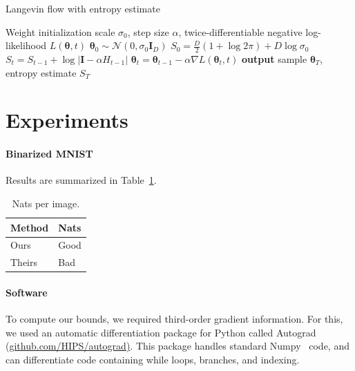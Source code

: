 \documentclass{article}
\newcommand{\vg}{\mathbf{g}}
\newcommand{\vr}{\mathbf{r}}
\newcommand{\vI}{\mathbf{I}}
\newcommand{\tra}{^{\mathsf{T}}}
\newcommand{\N}[2]{\mathcal{N}\!\left(#1,#2\right)}
\newcommand{\params}{\mathbf{\theta}}
\newcommand{\stepsize}{\alpha}
\newcommand{\gradparams}{\nabla L(\params_t, t)}
\newcommand{\entropy}{S}
\begin{document}
\begin{algorithm}[t]
   \caption{Langevin flow with entropy estimate}
   \label{alg:langevin-with-estimate}
\begin{algorithmic}[1]
	Weight initialization scale $\sigma_0$, step size $\stepsize$,
	twice-differentiable negative log-likelihood $L(\params, t)$
	 $\params_0 \sim \N{0}{\sigma_0 \vI_D}$
	 $\entropy_{0} = \frac{D}{2} (1 + \log 2 \pi) + D \log\sigma_0$
		\State $\entropy_{t} = \entropy_{t-1} + \log \left| \vI - \stepsize H_{t-1} \right|$ \label{step:entropy-update}
		\State $\params_{t} = \params_{t-1} - \stepsize \gradparams$  	
   \EndFor
   \State \textbf{output} sample $\params_T$, entropy estimate $\entropy_T$
\end{algorithmic}
\end{algorithm}


\section{Experiments}
\label{sec:experiments}


\paragraph{Binarized MNIST}

Results are summarized in Table~\ref{table:mnist results}.
%
\begin{table}
\begin{center}
\begin{tabular}{l|l}
Method & Nats \\
\midrule
Ours & Good \\
Theirs & Bad
\end{tabular}
\label{table:mnist results}
\caption{Nats per image.}
\end{center}
\end{table}

\paragraph{Software}
To compute our bounds, we required third-order gradient information.
For this, we used an automatic differentiation package for Python called Autograd (\url{github.com/HIPS/autograd)}.
This package handles standard Numpy~\citep{oliphant2007python} code, and can differentiate code containing while loops, branches, and indexing.
\end{document}
